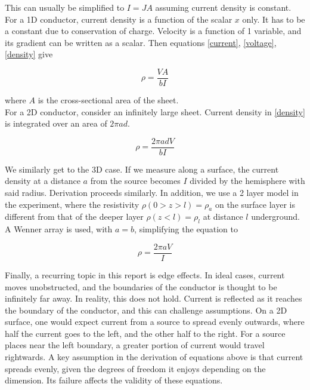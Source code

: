 \documentclass[12pt]{IEEEtran}
\begin{document}
This can usually be simplified to $I = JA$ assuming current density is constant. \\

For a 1D conductor, current density is a function of the scalar $x$ only. It has to be a constant due to conservation of charge. Velocity is a function of 1 variable, and its gradient can be written as a scalar. Then equations \ref{current}, \ref{voltage}, \ref{density} give

\begin{equation} \label{1D}
    \rho = \frac{VA}{bI}
\end{equation}

where $A$ is the cross-sectional area of the sheet. \\
For a 2D conductor, consider an infinitely large sheet. Current density in \ref{density} is integrated over an area of $2\pi ad$.

\begin{equation}\label{2D}
    \rho = \frac{2\pi adV}{bI}
\end{equation}

We similarly get to the 3D case. If we measure along a surface, the current density at a distance $a$ from the source becomes $I$ divided by the hemisphere with said radius. Derivation proceeds similarly. In addition, we use a 2 layer model in the experiment, where the resistivity $\rho(0 > z > l) = \rho_a$ on the surface layer is different from that of the deeper layer $\rho(z < l) = \rho_l$ at distance $l$ underground. A Wenner array is used, with $a=b$, simplifying the equation to

\begin{equation}
    \rho = \frac{2\pi aV}{I}
\end{equation}

Finally, a recurring topic in this report is edge effects. In ideal cases, current moves unobstructed, and the boundaries of the conductor is thought to be infinitely far away. In reality, this does not hold. Current is reflected as it reaches the boundary of the conductor, and this can challenge assumptions. On a 2D surface, one would expect current from a source to spread evenly outwards, where half the current goes to the left, and the other half to the right. For a source places near the left boundary, a greater portion of current would travel rightwards. A key assumption in the derivation of equations above is that current spreads evenly, given the degrees of freedom it enjoys depending on the dimension. Its failure affects the validity of these equations.
\end{document}
